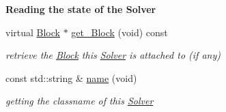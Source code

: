 \begin{Indent}\textbf{ Reading the state of the Solver}\par
\begin{DoxyCompactItemize}
\item 
\mbox{\label{class_s_m_spp__di__unipi__it_1_1_solver_aeab9493c6a867bb3837f9712928485e3}} 
virtual \mbox{\hyperlink{class_s_m_spp__di__unipi__it_1_1_block}{Block}} $\ast$ \mbox{\hyperlink{class_s_m_spp__di__unipi__it_1_1_solver_aeab9493c6a867bb3837f9712928485e3}{get\+\_\+\+Block}} (void) const
\begin{DoxyCompactList}\small\item\em retrieve the \mbox{\hyperlink{class_s_m_spp__di__unipi__it_1_1_block}{Block}} this \mbox{\hyperlink{class_s_m_spp__di__unipi__it_1_1_solver}{Solver}} is attached to (if any) \end{DoxyCompactList}\item 
const std\+::string \& \mbox{\hyperlink{class_s_m_spp__di__unipi__it_1_1_solver_a81dba299d9c4ccc6c1e6be0a845142fd}{name}} (void)
\begin{DoxyCompactList}\small\item\em getting the classname of this \mbox{\hyperlink{class_s_m_spp__di__unipi__it_1_1_solver}{Solver}} \end{DoxyCompactList}\end{DoxyCompactItemize}
\end{Indent}

